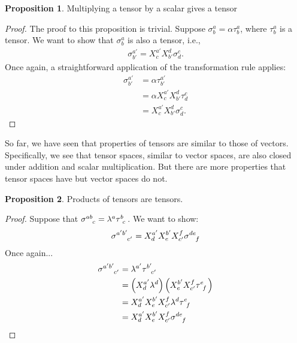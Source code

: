 \documentclass{book}
\theoremstyle{definition}
\newtheorem{prop}{Proposition}[section]
\begin{document}
\begin{prop}
	Multiplying a tensor by a scalar gives a tensor
\end{prop}
\begin{proof}
	The proof to this proposition is trivial. Suppose $\sigma^a_b = \alpha \tau^a_b$, where $\tau^a_b$ is a tensor. We want to show that $\sigma^a_b$ is also a tensor, i.e.,
	\begin{align*}
	\sigma^{a'}_{b'} = X^{a'}_{c}X^d_{b'}\sigma^{c}_d.
	\end{align*}
	Once again, a straightforward application of the transformation rule applies:
	\begin{align*}
	\sigma^{a'}_{b'} &= \alpha\tau^{a'}_{b'}\\
	&= \alpha X^{a'}_{c}X^d_{b'}\tau^{c}_{d}\\
	&= X^{a'}_{c}X^d_{b'} \sigma^{c}_d.
	\end{align*}
\end{proof}

So far, we have seen that properties of tensors are similar to those of vectors. Specifically, we see that tensor spaces, similar to vector spaces, are also closed under addition and scalar multiplication. But there are more properties that tensor spaces have but vector spaces do not.

\begin{prop}
	Products of tensors are tensors.
\end{prop}
\begin{proof}
	Suppose that $\tensor{\sigma}{^{ab}_c} = \lambda^a \tensor{\tau}{^b_c}$. We want to show:
	\begin{align*}
	\tensor{\sigma}{^{a'b'}_{c'}} = X^{a'}_{d}X^{b'}_{e}X^{f}_{c'}\tensor{\sigma}{^{de}_f}
	\end{align*}
	Once again...
	\begin{align*}
	\tensor{\sigma}{^{a'b'}_{c'}} &= \lambda^{a'}\tensor{\tau}{^{b'}_{c'}}\\
	&= \left(X^{a'}_d \lambda^d \right) \left( X^{b'}_eX^f_{c'}\tensor{\tau}{^e_f}\right) \\
	&= X^{a'}_dX^{b'}_eX^f_{c'}\lambda^d\tensor{\tau}{^e_f}\\
	&= X^{a'}_{d}X^{b'}_{e}X^{f}_{c'}\tensor{\sigma}{^{de}_f}
	\end{align*}
\end{proof}
\end{document}
